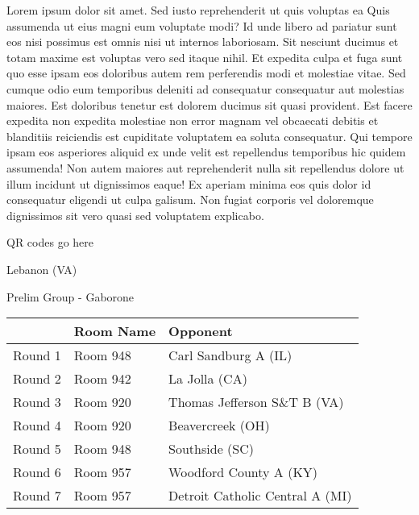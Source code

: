 \documentclass{article}%
\begin{document}
\vspace*{8pt}%
\linebreak%
\newline%
\newline%
Lorem ipsum dolor sit amet. Sed iusto reprehenderit ut quis voluptas ea Quis assumenda ut eius magni eum voluptate modi? Id unde libero ad pariatur sunt eos nisi possimus est omnis nisi ut internos laboriosam. Sit nesciunt ducimus et totam maxime est voluptas vero sed itaque nihil. Et expedita culpa et fuga sunt quo esse ipsam eos doloribus autem rem perferendis modi et molestiae vitae.\newline%
\newline%
Sed cumque odio eum temporibus deleniti ad consequatur consequatur aut molestias maiores. Est doloribus tenetur est dolorem ducimus sit quasi provident. Est facere expedita non expedita molestiae non error magnam vel obcaecati debitis et blanditiis reiciendis est cupiditate voluptatem ea soluta consequatur. Qui tempore ipsam eos asperiores aliquid ex unde velit est repellendus temporibus hic quidem assumenda!\newline%
\newline%
Non autem maiores aut reprehenderit nulla sit repellendus dolore ut illum incidunt ut dignissimos eaque! Ex aperiam minima eos quis dolor id consequatur eligendi ut culpa galisum. Non fugiat corporis vel doloremque dignissimos sit vero quasi sed voluptatem explicabo.\newline%
\newline%
%
\vspace*{30pt}%
\begin{center}%
\begin{Huge}%
QR codes go here%
\end{Huge}%
\end{center}%
\newpage%
%
\begin{center}%
\begin{Huge}%
Lebanon (VA)%
\end{Huge}%
\vspace*{8pt}%
\linebreak%
\begin{Large}%
Prelim Group {-} Gaborone%
\end{Large}%
\end{center}%
\begin{tabularx}{\textwidth}{|c|Y|Y|}%
\hline%
&Room Name&Opponent\\%
\hline%
Round 1&Room 948&Carl Sandburg A (IL)\\%
Round 2&Room 942&La Jolla (CA)\\%
Round 3&Room 920&Thomas Jefferson S\&T B (VA)\\%
Round 4&Room 920&Beavercreek (OH)\\%
Round 5&Room 948&Southside (SC)\\%
Round 6&Room 957&Woodford County A (KY)\\%
Round 7&Room 957&Detroit Catholic Central A (MI)\\%
\hline%
\end{tabularx}%
\end{document}
